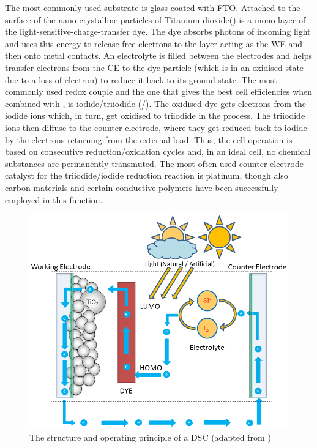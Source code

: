 The most commonly used substrate is glass coated with \ac{FTO}. Attached to the surface of the nano-crystalline particles of Titanium dioxide() is a mono-layer of the light-sensitive-charge-transfer dye. The dye absorbs photons of incoming light and uses this energy to release free electrons to the  layer acting as the \ac{WE} and then onto metal contacts. An electrolyte is filled between the electrodes and helps transfer electrons from the \ac{CE} to the dye particle (which is in an oxidised state due to a loss of electron) to reduce it back to its ground state. The most commonly used redox couple and the one that gives the best cell efficiencies when combined with , is iodide/triiodide (/). The oxidised dye gets electrons from the iodide ions which, in turn, get oxidised to triiodide in the process. The triiodide ions then diffuse to the counter electrode, where they get reduced back to iodide by the electrons returning from the external load. Thus, the cell operation is based on consecutive reduction/oxidation cycles and, in an ideal cell, no chemical substances are permanently transmuted. The most often used counter electrode catalyst for the triiodide/iodide reduction reaction is platinum, though also carbon materials and certain conductive polymers have been successfully employed in this function.\\
\begin{figure}[H]
\begin{center}
\includegraphics[width=\textwidth]{images/Cell_Cycle}
\caption{ The structure and operating principle of a DSC (adapted from \cite{toivola2010dye,}\cite{gcell_DSSC_cycle})}
\label{fig:Cell_Cycle}
\end{center}
\end{figure}

